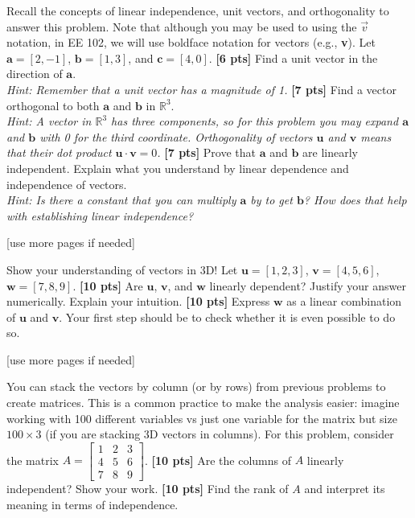 \documentclass{ee102_pset} %
\author{\rule{3cm}{0.4pt}} %
\begin{document}
 Recall the concepts of linear independence, unit vectors, and orthogonality to answer this problem. Note that although you may be used to using the $\vec{v}$ notation, in EE 102, we will use boldface notation for vectors (e.g., \textbf{v}).
Let $\textbf{a} = [2, -1]$, $\textbf{b} = [1, 3]$, and $\textbf{c} = [4, 0]$.
\problempart \textbf{[6 pts]} Find a unit vector in the direction of $\textbf{a}$. \\ 
\textit{Hint: Remember that a unit vector has a magnitude of 1.}
\problempart \textbf{[7 pts]} Find a vector orthogonal to both $\textbf{a}$ and $\textbf{b}$ in $\mathbb{R}^3$. \\ \textit{Hint: A vector in $\mathbb{R}^3$ has three components, so for this problem you may expand $\textbf{a}$ and $\textbf{b}$ with 0 for the third coordinate. Orthogonality of vectors $\textbf{u}$ and $\textbf{v}$ means that their dot product $\textbf{u} \cdot \textbf{v} = 0$.}
\problempart \textbf{[7 pts]} Prove that $\textbf{a}$ and $\textbf{b}$ are linearly independent. Explain what you understand by linear dependence and independence of vectors.\\ \textit{Hint: Is there a constant that you can multiply $\textbf{a}$ by to get $\textbf{b}$? How does that help with establishing linear independence?}
\vspace*{\fill}
\begin{center}
[use more pages if needed]
\end{center}




 Show your understanding of vectors in 3D! 
Let $\textbf{u} = [1, 2, 3]$, $\textbf{v} = [4, 5, 6]$, $\textbf{w} = [7, 8, 9]$.
\problempart \textbf{[10 pts]} Are $\textbf{u}$, $\textbf{v}$, and $\textbf{w}$ linearly dependent? Justify your answer numerically. Explain your intuition.
\problempart \textbf{[10 pts]} Express $\textbf{w}$ as a linear combination of $\textbf{u}$ and $\textbf{v}$. Your first step should be to check whether it is even possible to do so.



\vspace*{\fill}
\begin{center}
[use more pages if needed]
\end{center}

 You can stack the vectors by column (or by rows) from previous problems to create matrices. This is a common practice to make the analysis easier: imagine working with 100 different variables vs just one variable for the matrix but size $100 \times 3$ (if you are stacking 3D vectors in columns).
For this problem, consider the matrix $A = \begin{bmatrix} 1 & 2 & 3 \\ 4 & 5 & 6 \\ 7 & 8 & 9 \end{bmatrix}$.
\problempart \textbf{[10 pts]} Are the columns of $A$ linearly independent? Show your work.
\problempart \textbf{[10 pts]} Find the rank of $A$ and interpret its meaning in terms of independence.
\end{document}

